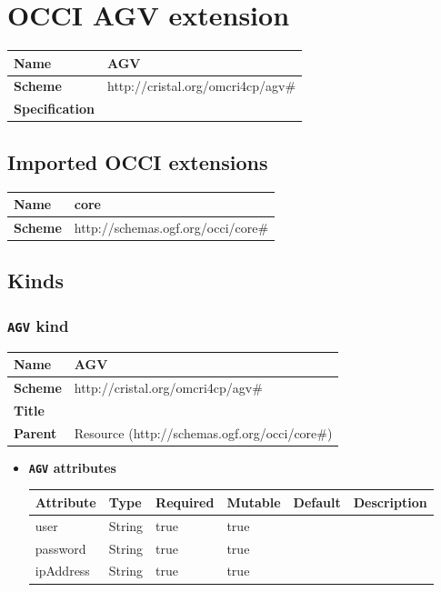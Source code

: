 \section{OCCI AGV extension}
\begin{center}
\begin{tabular}{|l|l|}
  \hline
  \textbf{Name} & AGV \\
  \hline  
  \textbf{Scheme} & http://cristal.org/omcri4cp/agv\# \\
  \hline
  \textbf{Specification} &  \\
  \hline
\end{tabular}
\end{center}

\subsection{Imported OCCI extensions}

\begin{center} 
\begin{tabular}{|l|l|}
  \hline
  \textbf{Name} & core \\
  \hline  
  \textbf{Scheme} & http://schemas.ogf.org/occi/core\# \\
  \hline
\end{tabular}
\end{center}


\subsection{Kinds}
\subsubsection{\texttt{AGV} kind}
\begin{center}
\begin{tabular}{|l|l|}
  \hline
  \textbf{Name} & AGV \\
  \hline  
  \textbf{Scheme} & http://cristal.org/omcri4cp/agv\# \\
  \hline
  \textbf{Title} &  \\
  \hline
  \textbf{Parent} & Resource (http://schemas.ogf.org/occi/core\#) \\
  \hline
\end{tabular}
\end{center}
\begin{itemize}
\item \textbf{\texttt{AGV} attributes}

\begin{tabularx}{\textwidth}{|l|l|p{1.4cm}|p{1.3cm}|l|X|}
  \hline
  \textbf{Attribute} & \textbf{Type} & \textbf{Required} & \textbf{Mutable} & \textbf{Default} & \textbf{Description} \\
  \hline  
  user & String & true & true &  &  \\
  \hline
  password & String & true & true &  &  \\
  \hline
  ipAddress & String & true & true &  &  \\
  \hline
\end{tabularx}
\end{itemize}



